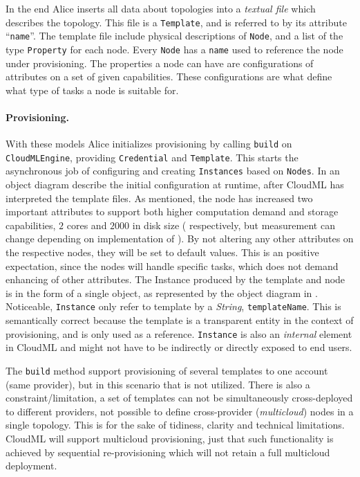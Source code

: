 In the end Alice inserts all data about topologies into a \emph{textual file} which describes the topology.
This file is a \texttt{Template}, and is referred to by its attribute ``\texttt{name}''.
The template file include physical descriptions of \texttt{Node},
and a list of the type \texttt{Property} for each node.
Every \texttt{Node} has a \texttt{name} used to reference the node under provisioning.
The properties a node can have are configurations of attributes on a set of given capabilities.
These configurations are what define what type of tasks a node is suitable for.

\paragraph{Provisioning.}


With these models Alice initializes provisioning by calling 
\texttt{build} on \texttt{CloudMLEngine}, providing \texttt{Credential} and \texttt{Template}.
This starts the asynchronous job of configuring and creating 
\texttt{Instances} based on \texttt{Nodes}.
In  an object diagram describe the initial configuration at runtime,
after CloudML has interpreted the template files.
As mentioned, the node has increased two important attributes to support both higher computation 
demand and storage capabilities, \ie $2$ cores and $2000$ in disk size 
( respectively, but measurement can change depending on implementation of ).
By not altering any other attributes on the respective nodes, they will be set to default values.
This is an positive expectation, since the nodes will handle specific tasks, which does not 
demand enhancing of other attributes.
The Instance produced by the template and node is in the form of a single object,
as represented by the object diagram in .
Noticeable, \texttt{Instance} only refer to template by a \emph{String}, \texttt{templateName}.
This is semantically correct because the template is a transparent entity
in the context of provisioning, and is only used as a reference.
\texttt{Instance} is also an \emph{internal} element in CloudML and might not 
have to be indirectly or directly exposed to end users.

The \texttt{build} method support provisioning of several templates to one account (same provider),
but in this scenario that is not utilized.
There is also a constraint/limitation, a set of templates can not be simultaneously 
cross-deployed to different providers,
\ie not possible to define cross-provider (\emph{multicloud}) nodes in a single topology.
This is for the sake of tidiness, clarity and technical limitations.
CloudML will support multicloud provisioning,
just that such functionality is achieved by sequential re-provisioning 
which will not retain a full multicloud deployment.

